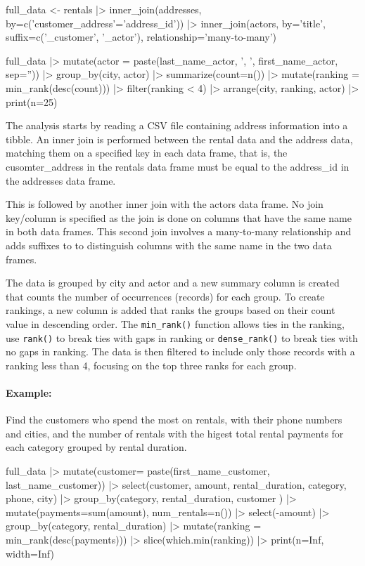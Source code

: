 \begin{Rcode}
full_data <- 
  rentals |> 
    inner_join(addresses, by=c('customer_address'='address_id')) |>
    inner_join(actors, by='title',
      suffix=c('_customer', '_actor'),
      relationship='many-to-many')
       
full_data |> 
  mutate(actor = 
    paste(last_name_actor, ', ', first_name_actor, sep='')) |>
  group_by(city, actor) |>
  summarize(count=n()) |>
  mutate(ranking = min_rank(desc(count))) |>
  filter(ranking < 4) |>
  arrange(city, ranking, actor) |>
  print(n=25)
\end{Rcode}

The analysis starts by reading a CSV file containing address information into a tibble. An inner join is performed between the rental data and the address data, matching them on a specified key in each data frame, that is, the cusomter\_address in the rentals data frame must be equal to the address\_id in the addresses data frame. 

This is followed by another inner join with the actors data frame. No join key/column is specified as the join is done on columns that have the same name in both data frames. This second join involves a many-to-many relationship and adds suffixes to to distinguish columns with the same name in the two data frames.

The data is grouped by city and actor and a new summary column is created that counts the number of occurrences (records) for each group. To create rankings, a new column is added that ranks the groups based on their count value in descending order. The \texttt{min\_rank()} function allows ties in the ranking, use \texttt{rank()} to break ties with gaps in ranking or \texttt{dense\_rank()} to break ties with no gaps in ranking. The data is then filtered to include only those records with a ranking less than 4, focusing on the top three ranks for each group.


\paragraph*{Example:} Find the customers who spend the most on rentals, with their phone numbers and cities, and the number of rentals with the higest total rental payments for each category grouped by rental duration.

\begin{Rcode}
full_data |>
   mutate(customer= paste(first_name_customer, last_name_customer)) |>
   select(customer, amount, rental_duration, category, phone, city) |>
   group_by(category, rental_duration, customer ) |>
   mutate(payments=sum(amount), num_rentals=n()) |>
   select(-amount) |>
   group_by(category, rental_duration) |>
   mutate(ranking = min_rank(desc(payments))) |>
   slice(which.min(ranking)) |>
   print(n=Inf, width=Inf)
\end{Rcode}

